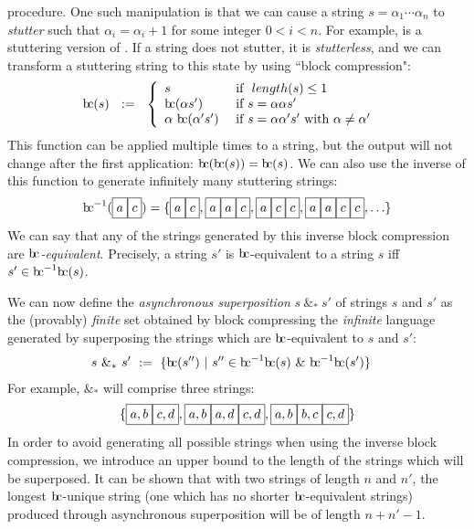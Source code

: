 \documentclass[a4paper,11pt,leqno]{article}
\newcommand{\bc}{{\rm b\!c}}
\newcommand{\vph}[1]{\vphantom{#1}}
\newcommand{\ebox}[1]{\fbox{$\vph{',}#1$}}
\newcommand{\eboxl}[1]{\fbox{$\vph{'}#1$}}
\begin{document}
procedure. One such manipulation is that 
we can cause a string $s=\alpha_1\cdots\alpha_n$ to \textit{stutter} such that 
$\alpha_i=\alpha_i+1$ for some integer $0 < i < n$. For example, 
\eboxl{a}\eboxl{a}\eboxl{a}\eboxl{c}\eboxl{c}
 is a stuttering version of 
\eboxl{a}\eboxl{c}. If 
a string does not 
stutter, it is \textit{stutterless}, and we can transform a stuttering string 
to this 
state by using ``block compression":
\begin{align}
\bc(s)  &\ \ :=\ \
\left\{ \begin{array}{ll}
s & \mbox{ if }~length(s)\leq 1 \\
\bc({\alpha}s')  & \mbox{ if } s={\alpha}{\alpha}s'\\
\alpha ~{\bc}({\alpha'}{s'})  
& \mbox{ if } s=\alpha{\alpha'}{s'} \mbox{ with } \alpha\neq\alpha'
\end{array}
\right. 
\end{align}
This function can be applied multiple times to a string, but the output will 
not change after the first application: $\bc(\bc(s)) = \bc(s)$. We can also use 
the inverse of this function to generate infinitely many stuttering strings:
\begin{align}
\bc^{-1}(\ebox{a}\ebox{c}) = 
\{ \ebox{a}\ebox{c},
\ebox{a}\ebox{a}\ebox{c},
\ebox{a}\ebox{c}\ebox{c}, 
\ebox{a}\ebox{a}\ebox{c}\ebox{c}, 
\ldots \}
\end{align}
We can say that any of the strings generated by this inverse block compression 
are \textit{$\bc{}$-equivalent}. Precisely, a string $s'$ is $\bc{}$-equivalent 
to a 
string 
$s$ iff $s' \in \bc^{-1}\bc(s)$.

We can now define the \textit{asynchronous superposition} $s~\&_*~s'$ of 
strings $s$ and 
$s'$ as the (provably) \textit{finite} set obtained by block compressing the 
\textit{infinite} 
language generated by superposing the strings which are $\bc$-equivalent to $s$ 
and $s'$:
\begin{align}
s\ \&_* \ s' & \ := \
\{\bc(s'') \ | \ s''\in \bc^{-1}\bc(s)\ \& \ \bc^{-1}\bc(s')\}
\end{align}
For example, \ebox{a}\ebox{c} $\&_*$ 
\ebox{b}\ebox{d} will comprise 
three strings:
\begin{align}
\{ \ebox{a, b}\ebox{c, d},
\ebox{a, b}\ebox{a, d}\ebox{c, d},
\ebox{a, b}\ebox{b, c}\ebox{c, d} \}
\end{align}
In order to avoid generating all possible strings when using the inverse block 
compression, we introduce an upper bound to the length of the strings which 
will be superposed. It can be shown that with two strings of length $n$ and 
$n'$, the longest $\bc$-unique string (one which has no shorter 
$\bc$-equivalent strings) produced through asynchronous superposition will be 
of length $n+n'-1$.
\end{document}
